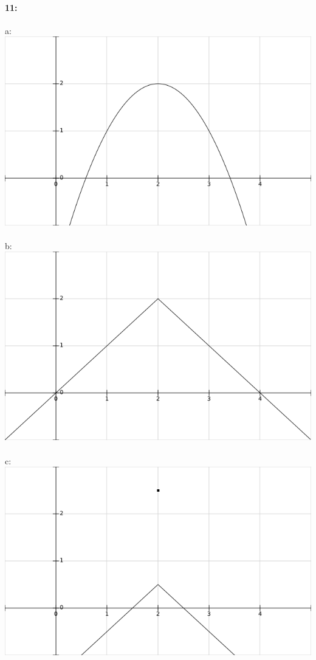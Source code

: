 \documentclass{article}
\begin{document}
    \paragraph*{11:\\} 
        a:\\ \includegraphics[scale=.333]{graph11a.png}\\\\
        b:\\ \includegraphics[scale=.333]{graph11b.png}\\\\
        c:\\ \includegraphics[scale=.333]{graph11c.png}\\\\
\end{document}
